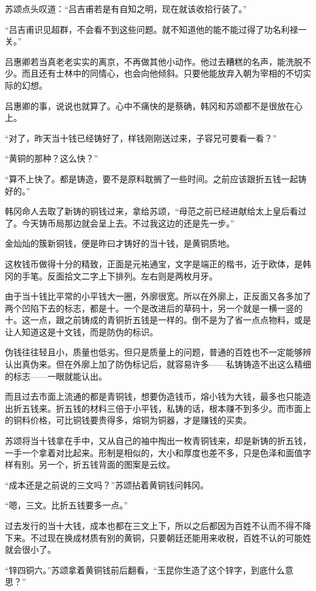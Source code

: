 苏颂点头叹道：“吕吉甫若是有自知之明，现在就该收拾行装了。”

“吕吉甫识见超群，不会看不到这些问题。就不知道他的能不能过得了功名利禄一关。”

吕惠卿若当真老老实实的离京，不再做其他小动作。他过去糟糕的名声，能洗脱不少。而且还有士林中的同情心，也会向他倾斜。只要他能放弃入朝为宰相的不切实际的幻想。

吕惠卿的事，说说也就算了。心中不痛快的是蔡确，韩冈和苏颂都不是很放在心上。

“对了，昨天当十钱已经铸好了，样钱刚刚送过来，子容兄可要看一看？”

“黄铜的那种？这么快？”

“算不上快了。都是铸造，要不是原料耽搁了一些时间。之前应该跟折五钱一起铸好的。”

韩冈命人去取了新铸的铜钱过来，拿给苏颂，“母范之前已经进献给太上皇后看过了。今天铸币局那边就会呈上去。不过我这边的还是先一步。”

金灿灿的簇新铜钱，便是昨曰才铸好的当十钱，是黄铜质地。

这枚钱币做得十分的精致，正面是元祐通宝，文字是端正的楷书，近于欧体，是韩冈的手笔。反面拾文二字上下排列。左右则是两枚月牙。

由于当十钱比平常的小平钱大一圈，外廓很宽。所以在外廓上，正反面又各多加了两个凹陷下去的标志，都是十。一个是改进后的草码十，另一个就是一横一竖的十。这一点，跟之前铸成的青铜折五钱是一样的。倒不是为了省一点点物料，或是让人知道这是十文钱，而是防伪的标识。

伪钱往往轻且小，质量也低劣。但只是质量上的问题，普通的百姓也不一定能够辨认出真伪来。但在外廓上加了防伪标记后，就容易许多——私铸铸造不出这么精细的标志——一眼就能认出。

而且过去市面上流通的都是青铜钱，想要伪造钱币，熔小钱为大钱，最多也只能造出折五钱来。折五钱的材料三倍于小平钱，私铸的话，根本赚不到多少。而市面上的铜料价格，可比铜钱要贵得多，熔铜为铜器，才是赚钱的买卖。

苏颂将当十钱拿在手中，又从自己的袖中掏出一枚青铜钱来，却是新铸的折五钱，一手一个拿着对比起来。形制是相似的，大小和厚度也差不多，只是色泽和面值字样有别。另一个，折五钱背面的图案是云纹。

“成本还是之前说的三文吗？”苏颂拈着黄铜钱问韩冈。

“嗯，三文。比折五钱要多一点。”

过去发行的当十大钱，成本也都在三文上下，所以之后都因为百姓不认而不得不降下来。不过现在换成材质有别的黄铜，只要朝廷还能用来收税，百姓不认的可能姓就会很小了。

“锌四铜六。”苏颂拿着黄铜钱前后翻看，“玉昆你生造了这个锌字，到底什么意思？”

